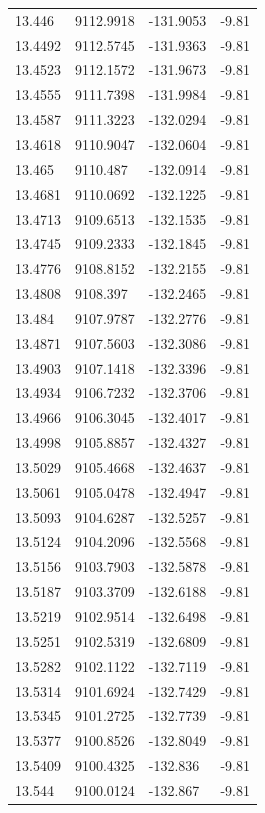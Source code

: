 \begin{table}[H]
\begin{tabular}{llll}
13.446 & 9112.9918 & -131.9053 & -9.81 \\
13.4492 & 9112.5745 & -131.9363 & -9.81 \\
13.4523 & 9112.1572 & -131.9673 & -9.81 \\
13.4555 & 9111.7398 & -131.9984 & -9.81 \\
13.4587 & 9111.3223 & -132.0294 & -9.81 \\
13.4618 & 9110.9047 & -132.0604 & -9.81 \\
13.465 & 9110.487 & -132.0914 & -9.81 \\
13.4681 & 9110.0692 & -132.1225 & -9.81 \\
13.4713 & 9109.6513 & -132.1535 & -9.81 \\
13.4745 & 9109.2333 & -132.1845 & -9.81 \\
13.4776 & 9108.8152 & -132.2155 & -9.81 \\
13.4808 & 9108.397 & -132.2465 & -9.81 \\
13.484 & 9107.9787 & -132.2776 & -9.81 \\
13.4871 & 9107.5603 & -132.3086 & -9.81 \\
13.4903 & 9107.1418 & -132.3396 & -9.81 \\
13.4934 & 9106.7232 & -132.3706 & -9.81 \\
13.4966 & 9106.3045 & -132.4017 & -9.81 \\
13.4998 & 9105.8857 & -132.4327 & -9.81 \\
13.5029 & 9105.4668 & -132.4637 & -9.81 \\
13.5061 & 9105.0478 & -132.4947 & -9.81 \\
13.5093 & 9104.6287 & -132.5257 & -9.81 \\
13.5124 & 9104.2096 & -132.5568 & -9.81 \\
13.5156 & 9103.7903 & -132.5878 & -9.81 \\
13.5187 & 9103.3709 & -132.6188 & -9.81 \\
13.5219 & 9102.9514 & -132.6498 & -9.81 \\
13.5251 & 9102.5319 & -132.6809 & -9.81 \\
13.5282 & 9102.1122 & -132.7119 & -9.81 \\
13.5314 & 9101.6924 & -132.7429 & -9.81 \\
13.5345 & 9101.2725 & -132.7739 & -9.81 \\
13.5377 & 9100.8526 & -132.8049 & -9.81 \\
13.5409 & 9100.4325 & -132.836 & -9.81 \\
13.544 & 9100.0124 & -132.867 & -9.81 \\

\end{tabular}
\end{table}
